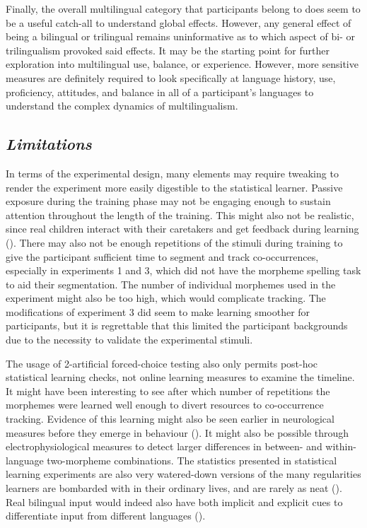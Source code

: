 Finally, the overall multilingual category that participants belong to does seem to be a useful catch-all to understand global effects. However, any general effect of being a bilingual or trilingual remains uninformative as to which aspect of bi- or trilingualism provoked said effects. It may be the starting point for further exploration into multilingual use, balance, or experience. However, more sensitive measures are definitely required to look specifically at language history, use, proficiency, attitudes, and balance in all of a participant's languages to understand the complex dynamics of multilingualism.


\subsection{\large{\emph{Limitations}}}
\noindent
In terms of the experimental design, many elements may require tweaking to render the experiment more easily digestible to the statistical learner. Passive exposure during the training phase may not be engaging enough to sustain attention throughout the length of the training. This might also not be realistic, since real children interact with their caretakers and get feedback during learning (\cite{Frost2019}). There may also not be enough repetitions of the stimuli during training to give the participant sufficient time to segment and track co-occurrences, especially in experiments 1 and 3, which did not have the morpheme spelling task to aid their segmentation. The number of individual morphemes used in the experiment might also be too high, which would complicate tracking. The modifications of experiment 3 did seem to make learning smoother for participants, but it is regrettable that this limited the participant backgrounds due to the necessity to validate the experimental stimuli. 

The usage of 2-artificial forced-choice testing also only permits post-hoc statistical learning checks, not online learning measures to examine the timeline. It might have been interesting to see after which number of repetitions the morphemes were learned well enough to divert resources to co-occurrence tracking. Evidence of this learning might also be seen earlier in neurological measures before they emerge in behaviour (\cite{Aguasvivas2024}). It might also be possible through electrophysiological measures to detect larger differences in  between- and within-language two-morpheme combinations. The statistics presented in statistical learning experiments are also very watered-down versions of the many regularities learners are bombarded with in their ordinary lives, and are rarely as neat (\cite{Frost2019}). Real bilingual input would indeed also have both implicit and explicit cues to differentiate input from different languages (\cite{Weiss2009}).



